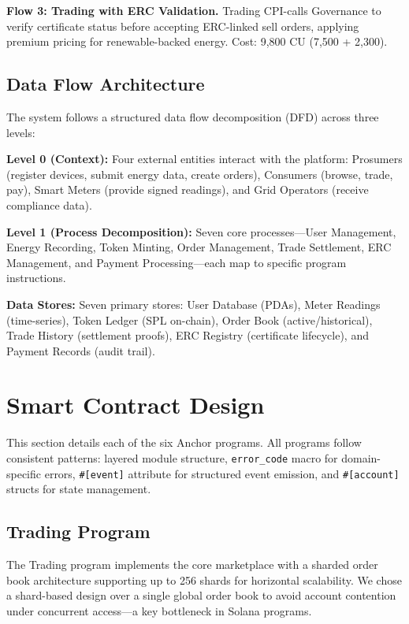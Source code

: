 \documentclass[conference]{IEEEtran}
\begin{document}
\textbf{Flow 3: Trading with ERC Validation.} Trading CPI-calls Governance to verify certificate status before accepting ERC-linked sell orders, applying premium pricing for renewable-backed energy. Cost: 9,800 CU (7,500 + 2,300).

\subsection{Data Flow Architecture}

The system follows a structured data flow decomposition (DFD) across three levels:

\textbf{Level 0 (Context):} Four external entities interact with the platform: Prosumers (register devices, submit energy data, create orders), Consumers (browse, trade, pay), Smart Meters (provide signed readings), and Grid Operators (receive compliance data).

\textbf{Level 1 (Process Decomposition):} Seven core processes---User Management, Energy Recording, Token Minting, Order Management, Trade Settlement, ERC Management, and Payment Processing---each map to specific program instructions.

\textbf{Data Stores:} Seven primary stores: User Database (PDAs), Meter Readings (time-series), Token Ledger (SPL on-chain), Order Book (active/historical), Trade History (settlement proofs), ERC Registry (certificate lifecycle), and Payment Records (audit trail).

\section{Smart Contract Design}
\label{sec:contracts}

This section details each of the six Anchor programs. All programs follow consistent patterns: layered module structure, \texttt{error\_code} macro for domain-specific errors, \texttt{\#[event]} attribute for structured event emission, and \texttt{\#[account]} structs for state management.

\subsection{Trading Program}
\label{sec:trading}

The Trading program implements the core marketplace with a sharded order book architecture supporting up to 256 shards for horizontal scalability. We chose a shard-based design over a single global order book to avoid account contention under concurrent access---a key bottleneck in Solana programs.
\end{document}
